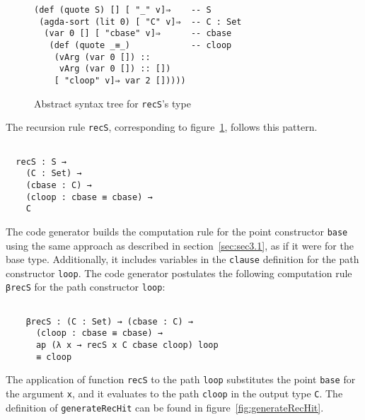 \documentclass[sigplan,10pt]{acmart}
\begin{document}
\begin{figure}
\begin{center}
\begingroup
\begin{Verbatim}
(def (quote S) [] [ "_" v]⇒    -- S
 (agda-sort (lit 0) [ "C" v]⇒  -- C : Set
  (var 0 [] [ "cbase" v]⇒      -- cbase
   (def (quote _≡_)            -- cloop
    (vArg (var 0 []) ::
     vArg (var 0 []) :: [])
    [ "cloop" v]⇒ var 2 []))))
\end{Verbatim}
\endgroup
\end{center}
\caption{Abstract syntax tree for {\tt recS}'s type}
\label{fig:ast-f}
\end{figure}
\normalsize

The recursion rule {\tt recS}, corresponding to figure~\ref{fig:ast-f}, follows this pattern.
\begin{center}
\begingroup
\begin{BVerbatim}

  recS : S → 
    (C : Set) →
    (cbase : C) →
    (cloop : cbase ≡ cbase) →
    C

\end{BVerbatim}
\endgroup
\end{center}

The code generator builds the computation rule for the point constructor {\tt base} using the same approach as described in section~\ref{sec:sec3.1}, as if it were for the base type.
Additionally, it includes variables in the {\tt clause} definition for the path constructor {\tt loop}.
The code generator postulates the following computation rule {\tt βrecS} for the path constructor {\tt loop}:

\begin{center}
\begingroup
\begin{BVerbatim}

    βrecS : (C : Set) → (cbase : C) → 
      (cloop : cbase ≡ cbase) → 
      ap (λ x → recS x C cbase cloop) loop 
      ≡ cloop

\end{BVerbatim}
\endgroup
\end{center}

The application of function {\tt recS} to the path {\tt loop} substitutes the point {\tt base} for the argument {\tt x}, and it evaluates to the path {\tt cloop} in the output type {\tt C}. The definition of {\tt generateRecHit} can be found in figure~\ref{fig:generateRecHit}.
\end{document}
